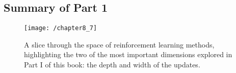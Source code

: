 \subsection{Summary of Part 1}
\begin{figure}
	\centering
	\texttt{[image: /chapter8\_7]}
	\caption{A slice through the space of reinforcement learning methods, highlighting the two of the most important dimensions explored in Part I of this book: the depth and width of the updates.}
	\label{fig: part1 summary}
\end{figure}

